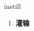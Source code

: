 
\begin{frame}
{\huge instill}
\begin{center}
\begin{enumerate}\Large
  \item \textbf{灌输}
\end{enumerate}
\end{center}
\end{frame}
